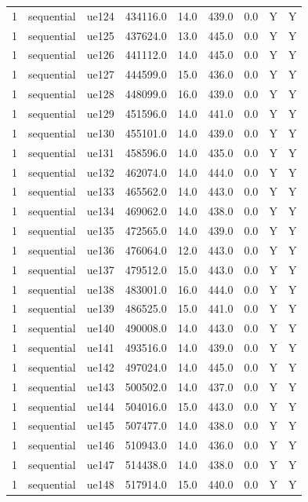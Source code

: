 \begin{table}[ht]
\begin{tabular}{|c|c|c|c|c|c|c|c|c|}
1 & sequential & ue124 & 434116.0 & 14.0 & 439.0 & 0.0 & Y & Y \\
1 & sequential & ue125 & 437624.0 & 13.0 & 445.0 & 0.0 & Y & Y \\
1 & sequential & ue126 & 441112.0 & 14.0 & 445.0 & 0.0 & Y & Y \\
1 & sequential & ue127 & 444599.0 & 15.0 & 436.0 & 0.0 & Y & Y \\
1 & sequential & ue128 & 448099.0 & 16.0 & 439.0 & 0.0 & Y & Y \\
1 & sequential & ue129 & 451596.0 & 14.0 & 441.0 & 0.0 & Y & Y \\
1 & sequential & ue130 & 455101.0 & 14.0 & 439.0 & 0.0 & Y & Y \\
1 & sequential & ue131 & 458596.0 & 14.0 & 435.0 & 0.0 & Y & Y \\
1 & sequential & ue132 & 462074.0 & 14.0 & 444.0 & 0.0 & Y & Y \\
1 & sequential & ue133 & 465562.0 & 14.0 & 443.0 & 0.0 & Y & Y \\
1 & sequential & ue134 & 469062.0 & 14.0 & 438.0 & 0.0 & Y & Y \\
1 & sequential & ue135 & 472565.0 & 14.0 & 439.0 & 0.0 & Y & Y \\
1 & sequential & ue136 & 476064.0 & 12.0 & 443.0 & 0.0 & Y & Y \\
1 & sequential & ue137 & 479512.0 & 15.0 & 443.0 & 0.0 & Y & Y \\
1 & sequential & ue138 & 483001.0 & 16.0 & 444.0 & 0.0 & Y & Y \\
1 & sequential & ue139 & 486525.0 & 15.0 & 441.0 & 0.0 & Y & Y \\
1 & sequential & ue140 & 490008.0 & 14.0 & 443.0 & 0.0 & Y & Y \\
1 & sequential & ue141 & 493516.0 & 14.0 & 439.0 & 0.0 & Y & Y \\
1 & sequential & ue142 & 497024.0 & 14.0 & 445.0 & 0.0 & Y & Y \\
1 & sequential & ue143 & 500502.0 & 14.0 & 437.0 & 0.0 & Y & Y \\
1 & sequential & ue144 & 504016.0 & 15.0 & 443.0 & 0.0 & Y & Y \\
1 & sequential & ue145 & 507477.0 & 14.0 & 438.0 & 0.0 & Y & Y \\
1 & sequential & ue146 & 510943.0 & 14.0 & 436.0 & 0.0 & Y & Y \\
1 & sequential & ue147 & 514438.0 & 14.0 & 438.0 & 0.0 & Y & Y \\
1 & sequential & ue148 & 517914.0 & 15.0 & 440.0 & 0.0 & Y & Y \\

\end{tabular}
\end{table}
